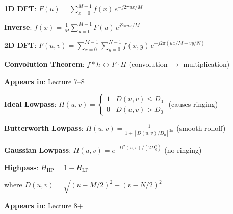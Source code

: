 \documentclass[10pt]{article}
\begin{document}

\begin{conceptbox}

\begin{formulabox}
\textbf{1D DFT}: $F(u) = \sum_{x=0}^{M-1} f(x)\, e^{-j2\pi ux/M}$

\textbf{Inverse}: $f(x) = \frac{1}{M}\sum_{u=0}^{M-1} F(u)\, e^{j2\pi ux/M}$

\textbf{2D DFT}: $F(u,v) = \sum_{x=0}^{M-1}\sum_{y=0}^{N-1} f(x,y)\, e^{-j2\pi(ux/M + vy/N)}$

\textbf{Convolution Theorem}: $f * h \leftrightarrow F \cdot H$ \hfill (convolution $\to$ multiplication)
\end{formulabox}

\textbf{Appears in}: Lecture 7--8

\end{conceptbox}


\begin{conceptbox}

\begin{formulabox}
\textbf{Ideal Lowpass}: $H(u,v) = \begin{cases} 1 & D(u,v) \le D_0 \\ 0 & D(u,v) > D_0 \end{cases}$ \hfill (causes ringing)

\textbf{Butterworth Lowpass}: $H(u,v) = \frac{1}{1 + [D(u,v)/D_0]^{2n}}$ \hfill (smooth rolloff)

\textbf{Gaussian Lowpass}: $H(u,v) = e^{-D^2(u,v)/(2D_0^2)}$ \hfill (no ringing)

\textbf{Highpass}: $H_{\text{HP}} = 1 - H_{\text{LP}}$

where $D(u,v) = \sqrt{(u-M/2)^2 + (v-N/2)^2}$
\end{formulabox}

\textbf{Appears in}: Lecture 8+

\end{conceptbox}

\end{document}
